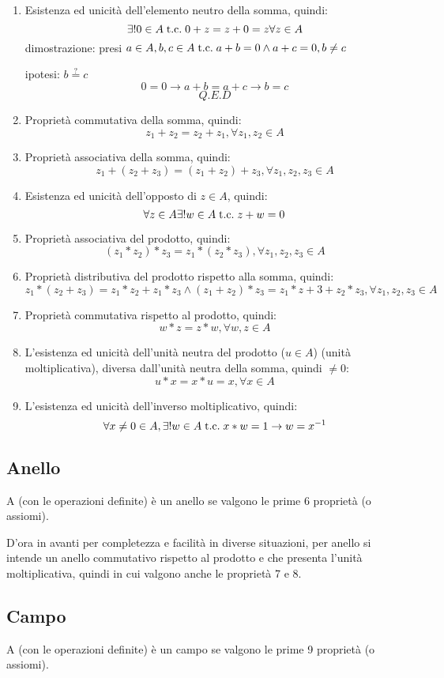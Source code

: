 \documentclass[a4paper,12pt]{article}
\begin{document}
	\begin{enumerate}
		\item Esistenza ed unicità dell'elemento neutro della somma, quindi:
		\[\exists! 0\in A \;\text{t.c.}\; 0 + z = z + 0 = z \forall z\in A\]
		dimostrazione: presi $a \in A, b,c \in A \;\text{t.c.}\; a + b = 0 \wedge a + c = 0, b \not = c$
		
		ipotesi: $b \stackrel{?}{=} c$
		\[0 = 0 \rightarrow a + b = a + c \rightarrow b = c\]
		\[Q.E.D\]
		\item Proprietà commutativa della somma, quindi: 
		\[z_1 + z_2 = z_2 + z_1, \forall z_1,z_2\in A\]
		\item Proprietà associativa della somma, quindi:
		\[z_1 + (z_2+z_3) = (z_1 + z_2) + z_3, \forall z_1,z_2,z_3\in A\]
		\item Esistenza ed unicità dell'opposto di $z \in A$, quindi:
		\[\forall z \in A \exists! w\in A \;\text{t.c.}\; z + w = 0\]
		\item Proprietà associativa del prodotto, quindi:
		\[(z_1 * z_2) * z_3 = z_1 * (z_2 * z_3), \forall z_1,z_2,z_3\in A\]
		\item Proprietà distributiva del prodotto rispetto alla somma, quindi:
		\[z_1 * (z_2 + z_3) = z_1 * z_2 + z_1 * z_3 \wedge (z_1 + z_2) * z_3 = z_1 * z+3 + z_2 * z_3, \forall z_1,z_2,z_3\in A\]
		\item Proprietà commutativa rispetto al prodotto, quindi:
		\[w * z = z * w, \forall w,z \in A\]
		\item L'esistenza ed unicità dell'unità neutra del prodotto ($u \in A$) (unità moltiplicativa), diversa dall'unità neutra della somma, quindi $\not = 0$:
		\[u * x = x * u = x, \forall x \in A\]
		\item L'esistenza ed unicità dell'inverso moltiplicativo, quindi:
		\[\forall x\not = 0 \in A, \exists! w\in A \;\text{t.c.}\; x * w = 1 \rightarrow w = x^{-1}\]
	\end{enumerate}
	
	\subsection{Anello}
	A (con le operazioni definite) è un anello se valgono le prime 6 proprietà (o assiomi).
	
	D'ora in avanti per completezza e facilità in diverse situazioni, per anello si intende un anello commutativo rispetto al prodotto e che presenta l'unità moltiplicativa, quindi in cui valgono anche le proprietà 7 e 8.
	
	\subsection{Campo}
	A (con le operazioni definite) è un campo se valgono le prime 9 proprietà (o assiomi).
	
\end{document}
